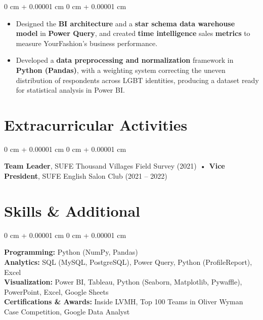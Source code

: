 \documentclass[10pt, a4paper]{article}
\newenvironment{highlights}{
    \begin{itemize}[
        topsep=0.04 cm,
        parsep=0.02cm,
        partopsep=0pt,
        itemsep=0pt,
        leftmargin=0 cm + 10pt
    ]
}{
    \end{itemize}
} %
\newenvironment{onecolentry}{
    \begin{adjustwidth}{
        0 cm + 0.00001 cm
    }{
        0 cm + 0.00001 cm
    }
}{
    \end{adjustwidth}
} %
\begin{document}
        \vspace{0.10 cm}
        \begin{onecolentry}
            \begin{highlights}
                \item Designed the \textbf{BI architecture} and a \textbf{star schema data warehouse model} in \textbf{Power Query}, and created \textbf{time intelligence} sales \textbf{metrics} to measure YourFashion's business performance.
                \item Developed a \textbf{data preprocessing and normalization} framework in \textbf{Python (Pandas)}, with a weighting system correcting the uneven distribution of respondents across LGBT identities, producing a dataset ready for statistical analysis in Power BI.
            \end{highlights}
        \end{onecolentry}

    \section{Extracurricular Activities}
        \begin{onecolentry}
            \textbf{Team Leader}, SUFE Thousand Villages Field Survey (2021) \,•\, \textbf{Vice President}, SUFE English Salon Club (2021 – 2022)
        \end{onecolentry}

    \section{Skills \& Additional}
        \begin{onecolentry}
        \textbf{Programming:} Python (NumPy, Pandas) \\
        \textbf{Analytics:} SQL (MySQL, PostgreSQL), Power Query, Python (ProfileReport), Excel \\
        \textbf{Visualization:} Power BI, Tableau, Python (Seaborn, Matplotlib, Pywaffle), PowerPoint, Excel, Google Sheets \\
        \textbf{Certifications \& Awards:} Inside LVMH, Top 100 Teams in Oliver Wyman Case Competition, Google Data Analyst
        \end{onecolentry}
\end{document}
